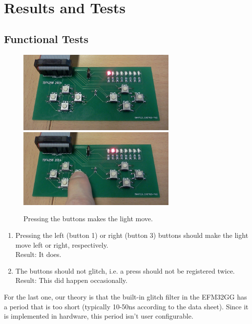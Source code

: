 \documentclass[a4paper, 12pt]{article}
\begin{document}
\section{Results and Tests} %
\label{sec:results_and_tests}
	\subsection{Functional Tests} %
	\label{sub:functional_tests}
        \begin{figure}[!ht]
        \includegraphics[width=0.7\textwidth]{IMG064}
        \includegraphics[width=0.7\textwidth]{IMG065}
        \caption{Pressing the buttons makes the light move.}
        \label{fig:buttons}
        \end{figure}
		\begin{enumerate}
			\item Pressing the left (button 1) or right (button 3) buttons should make the light move left or right, respectively. \\
				  Result: It does.
			\item The buttons should not glitch, i.e. a press should not be registered twice.\\
				  Result: This did happen occasionally.
		\end{enumerate}
		For the last one, our theory is that the built-in glitch filter in the EFM32GG has a period that is too short (typically 10-50ns according to the data sheet). Since it is implemented in hardware, this period isn't user configurable.
\end{document}
